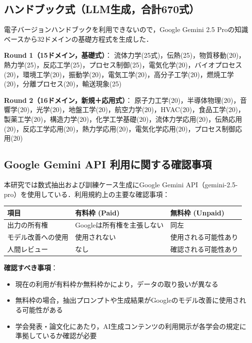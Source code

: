 \documentclass[11pt,a4paper]{ltjsarticle}
\begin{document}
\subsection{ハンドブック式（LLM生成，合計670式）}

電子バージョンハンドブックを利用できないので，Google Gemini 2.5 Proの知識ベースから32ドメインの基礎方程式を生成した．

\textbf{Round 1（15ドメイン，基礎式）}：
流体力学(25式)，伝熱(25)，物質移動(20)，熱力学(25)，反応工学(25)，プロセス制御(25)，電気化学(20)，バイオプロセス(20)，環境工学(20)，振動学(20)，電気工学(20)，高分子工学(20)，燃焼工学(20)，分離プロセス(20)，輸送現象(25)

\textbf{Round 2（16ドメイン，新規＋応用式）}：
原子力工学(20)，半導体物理(20)，音響学(20)，光学(20)，地盤工学(20)，航空力学(20)，HVAC(20)，食品工学(20)，製薬工学(20)，構造力学(20)，化学工学基礎(20)，流体力学応用(20)，伝熱応用(20)，反応工学応用(20)，熱力学応用(20)，電気化学応用(20)，プロセス制御応用(20)

\subsection{Google Gemini API 利用に関する確認事項}

本研究では数式抽出および訓練ケース生成にGoogle Gemini API（gemini-2.5-pro）を使用している．利用規約上の主要な確認事項：

\begin{table}[h]
\centering
\begin{tabular}{lll}
\toprule
項目 & 有料枠 (Paid) & 無料枠 (Unpaid) \\
\midrule
出力の所有権 & Googleは所有権を主張しない & 同左 \\
モデル改善への使用 & 使用されない & 使用される可能性あり \\
人間レビュー & なし & 確認される可能性あり \\
\bottomrule
\end{tabular}
\end{table}

\textbf{確認すべき事項}：
\begin{itemize}[nosep]
  \item 現在の利用が有料枠か無料枠かにより，データの取り扱いが異なる
  \item 無料枠の場合，抽出プロンプトや生成結果がGoogleのモデル改善に使用される可能性がある
  \item 学会発表・論文化にあたり，AI生成コンテンツの利用開示が各学会の規定に準拠しているか確認が必要
\end{itemize}
\end{document}
